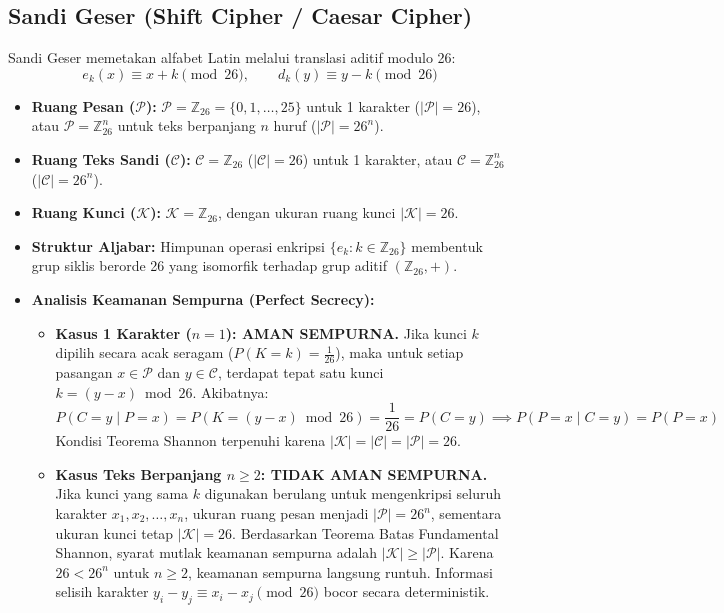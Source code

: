 \documentclass[11pt,a4paper]{article}
\begin{document}
\subsection{Sandi Geser (Shift Cipher / Caesar Cipher)}
Sandi Geser memetakan alfabet Latin melalui translasi aditif modulo 26:
\[
e_k(x) \equiv x + k \pmod{26}, \qquad d_k(y) \equiv y - k \pmod{26}
\]
\begin{itemize}[leftmargin=*]
    \item \textbf{Ruang Pesan ($\mathcal{P}$):} $\mathcal{P} = \mathbb{Z}_{26} = \{0, 1, \dots, 25\}$ untuk 1 karakter ($|\mathcal{P}| = 26$), atau $\mathcal{P} = \mathbb{Z}_{26}^n$ untuk teks berpanjang $n$ huruf ($|\mathcal{P}| = 26^n$).
    \item \textbf{Ruang Teks Sandi ($\mathcal{C}$):} $\mathcal{C} = \mathbb{Z}_{26}$ ($|\mathcal{C}| = 26$) untuk 1 karakter, atau $\mathcal{C} = \mathbb{Z}_{26}^n$ ($|\mathcal{C}| = 26^n$).
    \item \textbf{Ruang Kunci ($\mathcal{K}$):} $\mathcal{K} = \mathbb{Z}_{26}$, dengan ukuran ruang kunci $|\mathcal{K}| = 26$.
    \item \textbf{Struktur Aljabar:} Himpunan operasi enkripsi $\{e_k : k \in \mathbb{Z}_{26}\}$ membentuk grup siklis berorde 26 yang isomorfik terhadap grup aditif $(\mathbb{Z}_{26}, +)$.
    \item \textbf{Analisis Keamanan Sempurna (Perfect Secrecy):}
    \begin{itemize}
        \item \textbf{Kasus 1 Karakter ($n = 1$): AMAN SEMPURNA.} Jika kunci $k$ dipilih secara acak seragam ($P(K = k) = \frac{1}{26}$), maka untuk setiap pasangan $x \in \mathcal{P}$ dan $y \in \mathcal{C}$, terdapat tepat satu kunci $k = (y - x) \bmod 26$. Akibatnya:
        \[
        P(C = y \mid P = x) = P(K = (y - x) \bmod 26) = \frac{1}{26} = P(C = y) \implies P(P = x \mid C = y) = P(P = x)
        \]
        Kondisi Teorema Shannon terpenuhi karena $|\mathcal{K}| = |\mathcal{C}| = |\mathcal{P}| = 26$.
        \item \textbf{Kasus Teks Berpanjang $n \ge 2$: TIDAK AMAN SEMPURNA.} Jika kunci yang sama $k$ digunakan berulang untuk mengenkripsi seluruh karakter $x_1, x_2, \dots, x_n$, ukuran ruang pesan menjadi $|\mathcal{P}| = 26^n$, sementara ukuran kunci tetap $|\mathcal{K}| = 26$. Berdasarkan Teorema Batas Fundamental Shannon, syarat mutlak keamanan sempurna adalah $|\mathcal{K}| \ge |\mathcal{P}|$. Karena $26 < 26^n$ untuk $n \ge 2$, keamanan sempurna langsung runtuh. Informasi selisih karakter $y_i - y_j \equiv x_i - x_j \pmod{26}$ bocor secara deterministik.
    \end{itemize}
\end{itemize}
\end{document}
